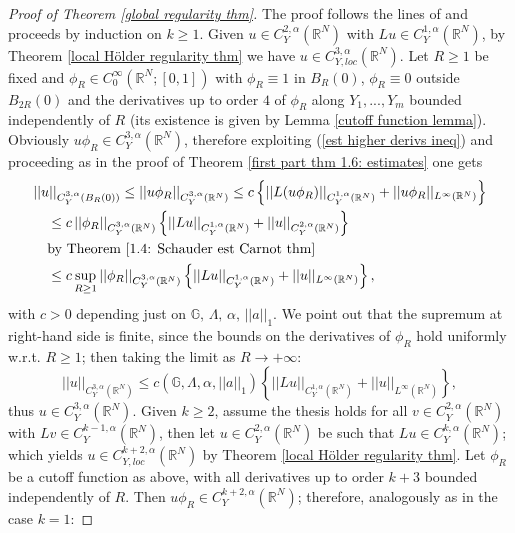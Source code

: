 \documentclass{article}
\numberwithin{equation}{section}
\begin{document}
\begin{proof}[Proof of Theorem \ref{global regularity thm}]
    The proof follows the lines of \cite[Theorem 6.1]{Global Sobolev est with a_ij} and proceeds by induction on $k \geq 1$. Given $u \in C^{2,\alpha}_Y(\mathbb{R}^N)$ with $Lu \in C^{1,\alpha}_Y(\mathbb{R}^N)$, by Theorem \ref{local Hölder regularity thm} we have $u \in C^{3,\alpha}_{Y,loc}(\mathbb{R}^N)$. Let $R \geq 1$ be fixed and $\phi_R \in C^{\infty}_0(\mathbb{R}^N;[0,1])$ with $\phi_R \equiv 1$ in $B_R(0)$, $\phi_R \equiv 0$ outside $B_{2R}(0)$ and the derivatives up to order $4$ of $\phi_R$ along $Y_1,...,Y_m$ bounded independently of $R$ (its existence is given by Lemma \ref{cutoff function lemma}). Obviously $u\phi_R \in C^{3,\alpha}_{Y}(\mathbb{R}^N)$, therefore exploiting (\ref{est higher derivs ineq}) and proceeding as in the proof of Theorem \ref{first part thm 1.6: estimates} one gets
    \begin{align*}
        & ||u||_{C^{3,\alpha}_Y(B_R(0))} \leq ||u \phi_R||_{C^{3,\alpha}_Y(\mathbb{R}^N)} \leq c \left\{ ||L(u \phi_R)||_{C^{1,\alpha}_Y(\mathbb{R}^N)} + ||u \phi_R||_{L^{\infty}(\mathbb{R}^N)} \right\} \\
        & \quad \leq c \, ||\phi_R||_{C^{3,\alpha}_Y(\mathbb{R}^N)} \left\{ ||Lu||_{C^{1,\alpha}_Y(\mathbb{R}^N)} + ||u||_{C^{2,\alpha}_Y(\mathbb{R}^N)} \right\} \\
        & \quad \text{by Theorem \ref{1.4: Schauder est Carnot thm}} \\
        & \quad \leq c \sup_{R \geq 1} ||\phi_R||_{C^{3,\alpha}_Y(\mathbb{R}^N)} \left\{||Lu||_{C^{1,\alpha}_Y(\mathbb{R}^N)} + ||u||_{L^{\infty}(\mathbb{R}^N)} \right\},
    \end{align*}
    with $c>0$ depending just on $\mathbb{G}, \, \Lambda, \, \alpha, \, ||a||_1$. We point out that the supremum at right-hand side is finite, since the bounds on the derivatives of $\phi_R$ hold uniformly w.r.t. $R \geq 1$; then taking the limit as $R \to +\infty$:
    \begin{equation*}
        ||u||_{C^{3,\alpha}_Y(\mathbb{R}^N)} \leq c(\mathbb{G}, \Lambda, \alpha, ||a||_1) \left\{ ||Lu||_{C^{1,\alpha}_Y(\mathbb{R}^N)} + ||u||_{L^{\infty}(\mathbb{R}^N)} \right\},
    \end{equation*}
    thus $u \in C^{3,\alpha}_Y(\mathbb{R}^N)$. Given $k \geq 2$, assume the thesis holds for all $v \in C^{2,\alpha}_Y(\mathbb{R}^N)$ with $Lv \in C^{k-1,\alpha}_Y(\mathbb{R}^N)$, then let $u\in C^{2,\alpha}_Y(\mathbb{R}^N)$ be such that $Lu \in C^{k,\alpha}_Y(\mathbb{R}^N)$; which yields $u \in C^{k+2,\alpha}_{Y,loc}(\mathbb{R}^N)$ by Theorem \ref{local Hölder regularity thm}. Let $\phi_R$ be a cutoff function as above, with all derivatives up to order $k+3$ bounded independently of $R$. Then $u \phi_R \in C^{k+2,\alpha}_Y(\mathbb{R}^N)$; therefore, analogously as in the case $k=1$:

\end{proof}
\end{document}
